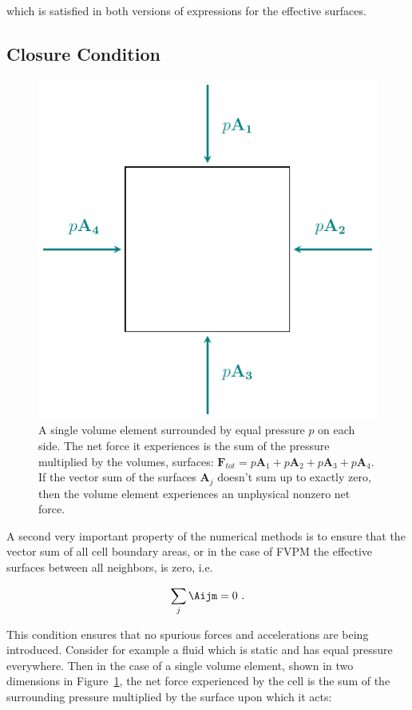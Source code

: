 which is satisfied in both versions of expressions for the effective surfaces.








\subsection{Closure Condition}\label{chap:meshless-conservation-closure}


\begin{figure}
 \centering
 \includegraphics[width=.5\textwidth]{figures/Meshless/pressure_equilibrium.pdf}%
 \caption{
A single volume element surrounded by equal pressure $p$ on each side. The net force it experiences
is the sum of the pressure multiplied by the volumes, surfaces: $\mathbf{F}_{tot} = p \mathbf{A}_1
+
 p \mathbf{A}_2 +  p \mathbf{A}_3 +  p \mathbf{A}_4$. If the vector sum of the surfaces
$\mathbf{A}_j$ doesn't sum up to exactly zero, then the volume element experiences an unphysical
nonzero net force.
 }
 \label{fig:pressure-equilibrium}
\end{figure}


A second very important property of the numerical methods is to ensure that the vector sum of all
cell boundary areas, or in the case of FVPM the effective surfaces between all neighbors, is zero,
i.e.

\begin{align}
 \sum_j \Aijm  =  0 \ .
\end{align}

This condition ensures that no spurious forces and accelerations are being introduced. Consider for
example a fluid which is static and has equal pressure everywhere. Then in the case of a single
volume element, shown in two dimensions in Figure~\ref{fig:pressure-equilibrium}, the net force
experienced by the cell is the sum of the surrounding pressure multiplied by the surface upon which
it acts:

